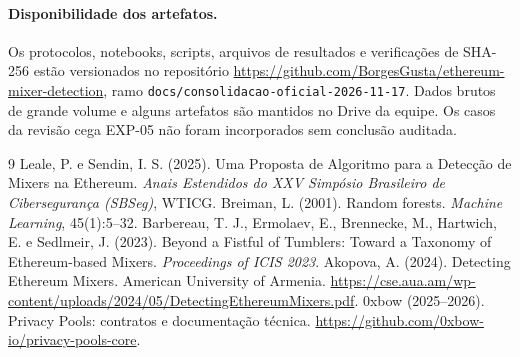 \documentclass[12pt]{article}
\begin{document}
\paragraph{Disponibilidade dos artefatos.} Os protocolos, notebooks, scripts, arquivos de resultados e verificações de SHA-256 estão versionados no repositório \url{https://github.com/BorgesGusta/ethereum-mixer-detection}, ramo \texttt{docs/consolidacao-oficial-2026-11-17}. Dados brutos de grande volume e alguns artefatos são mantidos no Drive da equipe. Os casos da revisão cega EXP-05 não foram incorporados sem conclusão auditada.

\begin{thebibliography}{9}
 Leale, P. e Sendin, I. S. (2025). Uma Proposta de Algoritmo para a Detecção de Mixers na Ethereum. \emph{Anais Estendidos do XXV Simpósio Brasileiro de Cibersegurança (SBSeg)}, WTICG.
 Breiman, L. (2001). Random forests. \emph{Machine Learning}, 45(1):5--32.
 Barbereau, T. J., Ermolaev, E., Brennecke, M., Hartwich, E. e Sedlmeir, J. (2023). Beyond a Fistful of Tumblers: Toward a Taxonomy of Ethereum-based Mixers. \emph{Proceedings of ICIS 2023}.
 Akopova, A. (2024). Detecting Ethereum Mixers. American University of Armenia. \url{https://cse.aua.am/wp-content/uploads/2024/05/DetectingEthereumMixers.pdf}.
 0xbow (2025--2026). Privacy Pools: contratos e documentação técnica. \url{https://github.com/0xbow-io/privacy-pools-core}.
\end{thebibliography}
\end{document}
